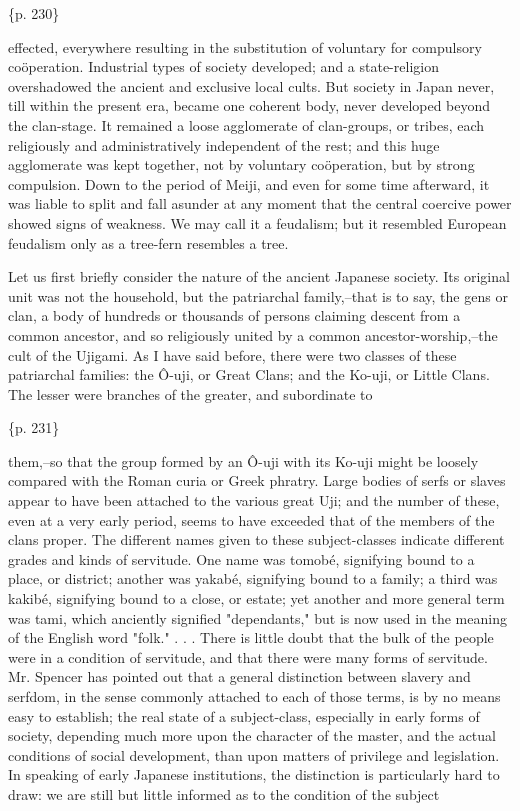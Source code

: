 \{p. 230\}

effected, everywhere resulting in the substitution of voluntary for compulsory coöperation. Industrial types of society developed; and a state-religion overshadowed the ancient and exclusive local cults. But society in Japan never, till within the present era, became one coherent body, never developed beyond the clan-stage. It remained a loose agglomerate of clan-groups, or tribes, each religiously and administratively independent of the rest; and this huge agglomerate was kept together, not by voluntary coöperation, but by strong compulsion. Down to the period of Meiji, and even for some time afterward, it was liable to split and fall asunder at any moment that the central coercive power showed signs of weakness. We may call it a feudalism; but it resembled European feudalism only as a tree-fern resembles a tree.



Let us first briefly consider the nature of the ancient Japanese society. Its original unit was not the household, but the patriarchal family,--that is to say, the gens or clan, a body of hundreds or thousands of persons claiming descent from a common ancestor, and so religiously united by a common ancestor-worship,--the cult of the Ujigami. As I have said before, there were two classes of these patriarchal families: the Ô-uji, or Great Clans; and the Ko-uji, or Little Clans. The lesser were branches of the greater, and subordinate to

\{p. 231\}

them,--so that the group formed by an Ô-uji with its Ko-uji might be loosely compared with the Roman curia or Greek phratry. Large bodies of serfs or slaves appear to have been attached to the various great Uji; and the number of these, even at a very early period, seems to have exceeded that of the members of the clans proper. The different names given to these subject-classes indicate different grades and kinds of servitude. One name was tomobé, signifying bound to a place, or district; another was yakabé, signifying bound to a family; a third was kakibé, signifying bound to a close, or estate; yet another and more general term was tami, which anciently signified "dependants," but is now used in the meaning of the English word "folk." . . . There is little doubt that the bulk of the people were in a condition of servitude, and that there were many forms of servitude. Mr. Spencer has pointed out that a general distinction between slavery and serfdom, in the sense commonly attached to each of those terms, is by no means easy to establish; the real state of a subject-class, especially in early forms of society, depending much more upon the character of the master, and the actual conditions of social development, than upon matters of privilege and legislation. In speaking of early Japanese institutions, the distinction is particularly hard to draw: we are still but little informed as to the condition of the subject

